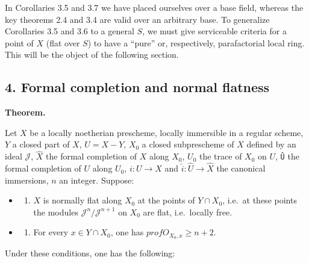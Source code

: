 \documentclass[
]{article}
\providecommand{\tightlist}{%
  \setlength{\itemsep}{0pt}\setlength{\parskip}{0pt}}
\begin{document}
In Corollaries 3.5 and 3.7 we have placed ourselves over a base field,
whereas the key theorems 2.4 and 3.4 are valid over an arbitrary base.
To generalize Corollaries 3.5 and 3.6 to a general \(S\), we must give
serviceable criteria for a point of \(X\) (flat over \(S\)) to have a
``pure'' or, respectively, parafactorial local ring. This will be the
object of the following section.

\subsection{4. Formal completion and normal
flatness}\label{formal-completion-and-normal-flatness}

\textbf{Theorem.}

Let \(X\) be a locally noetherian prescheme, locally immersible in a
regular scheme, \(Y\) a closed part of \(X\), \(U = X - Y\), \(X_{0}\) a
closed subprescheme of \(X\) defined by an ideal \(\mathcal{J}\),
\(\hat{X}\) the formal completion of \(X\) along \(X_{0}\), \(U_{0}\)
the trace of \(X_{0}\) on \(U\), \texttt{Û} the formal completion of
\(U\) along \(U_{0}\), \(i: U \to X\) and
\(\hat{i}: \hat{U} \to \hat{X}\) the canonical immersions, \(n\) an
integer. Suppose:

\begin{itemize}
\tightlist
\item
  \begin{enumerate}
  \def\labelenumi{\alph{enumi})}
  \tightlist
  \item
    \(X\) is normally flat along \(X_{0}\) at the points of
    \(Y \cap X_{0}\), i.e.~at these points the modules
    \(\mathcal{J}^{n}/\mathcal{J}^{n+1}\) on \(X_{0}\) are flat,
    i.e.~locally free.
  \end{enumerate}
\item
  \begin{enumerate}
  \def\labelenumi{\alph{enumi})}
  \setcounter{enumi}{1}
  \tightlist
  \item
    For every \(x \in Y \cap X_{0}\), one has
    \(prof O_{X_{0},x} \geqslant n + 2\).
  \end{enumerate}
\end{itemize}

Under these conditions, one has the following:
\end{document}
